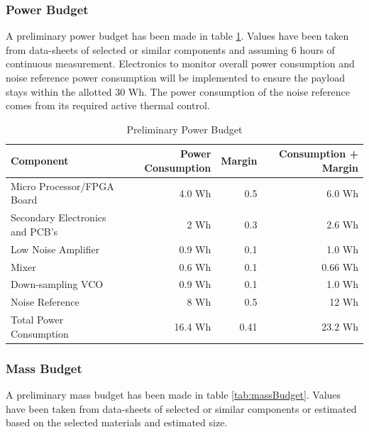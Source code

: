 \documentclass[12pt]{article}
\begin{document}
\subsubsection{Power Budget}

A preliminary power budget has been made in table \ref{tab:powerBudget}. Values have been taken from data-sheets of selected or similar components and assuming 6 hours of continuous measurement. Electronics to monitor overall power consumption and noise reference power consumption will be implemented to ensure the payload stays within the allotted 30 Wh. The power consumption of the noise reference comes from its required active thermal control. 

\begin{table}[!h]
	\centering
	\vspace{0.5cm}
	\renewcommand{\arraystretch}{1.3}
	\caption{Preliminary Power Budget}
	\label{tab:powerBudget}
	\begin{tabularx}{\textwidth}{lrrr}
		\toprule
		Component & Power Consumption & Margin & Consumption + Margin \\		
		\midrule
		Micro Processor/FPGA Board			&4.0 Wh & 0.5 & 6.0 Wh \\ 
		Secondary Electronics and PCB's		&2 Wh & 0.3 & 2.6 Wh \\
		Low Noise Amplifier					&0.9 Wh & 0.1 & 1.0 Wh \\ 
		Mixer						 		&0.6 Wh & 0.1 & 0.66 Wh \\ 
		Down-sampling VCO			 		&0.9 Wh & 0.1 & 1.0 Wh \\ 
		Noise Reference						&8 Wh & 0.5 & 12 Wh \\ \midrule
		Total Power Consumption				&16.4 Wh & 0.41 & 23.2 Wh
	\end{tabularx}	
\end{table}

\subsubsection{Mass Budget}

A preliminary mass budget has been made in table \ref{tab:massBudget}. Values have been taken from data-sheets of selected or similar components or estimated based on the selected materials and estimated size. 
\end{document}
